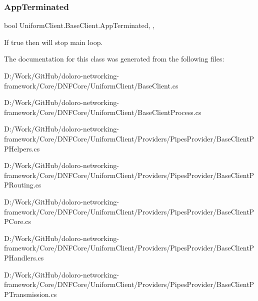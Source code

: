 \subsubsection{\texorpdfstring{App\+Terminated}{AppTerminated}}
{\footnotesize\ttfamily bool Uniform\+Client.\+Base\+Client.\+App\+Terminated\hspace{0.3cm}{\ttfamily [static]}, {\ttfamily [get]}, {\ttfamily [set]}}



If true then will stop main loop. 



The documentation for this class was generated from the following files\+:\begin{DoxyCompactItemize}
\item 
D\+:/\+Work/\+Git\+Hub/doloro-\/networking-\/framework/\+Core/\+D\+N\+F\+Core/\+Uniform\+Client/Base\+Client.\+cs\item 
D\+:/\+Work/\+Git\+Hub/doloro-\/networking-\/framework/\+Core/\+D\+N\+F\+Core/\+Uniform\+Client/Base\+Client\+Process.\+cs\item 
D\+:/\+Work/\+Git\+Hub/doloro-\/networking-\/framework/\+Core/\+D\+N\+F\+Core/\+Uniform\+Client/\+Providers/\+Pipes\+Provider/Base\+Client\+P\+P\+Helpers.\+cs\item 
D\+:/\+Work/\+Git\+Hub/doloro-\/networking-\/framework/\+Core/\+D\+N\+F\+Core/\+Uniform\+Client/\+Providers/\+Pipes\+Provider/Base\+Client\+P\+P\+Routing.\+cs\item 
D\+:/\+Work/\+Git\+Hub/doloro-\/networking-\/framework/\+Core/\+D\+N\+F\+Core/\+Uniform\+Client/\+Providers/\+Pipes\+Provider/Base\+Client\+P\+P\+Core.\+cs\item 
D\+:/\+Work/\+Git\+Hub/doloro-\/networking-\/framework/\+Core/\+D\+N\+F\+Core/\+Uniform\+Client/\+Providers/\+Pipes\+Provider/Base\+Client\+P\+P\+Handlers.\+cs\item 
D\+:/\+Work/\+Git\+Hub/doloro-\/networking-\/framework/\+Core/\+D\+N\+F\+Core/\+Uniform\+Client/\+Providers/\+Pipes\+Provider/Base\+Client\+P\+P\+Transmission.\+cs\end{DoxyCompactItemize}
